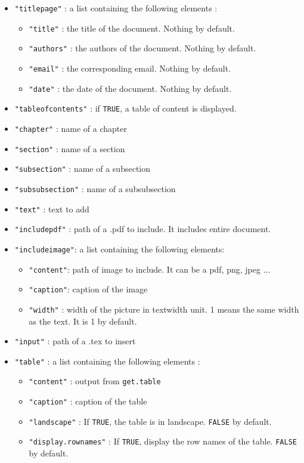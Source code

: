 \documentclass{article}\usepackage[]{graphicx}\usepackage[]{color}
\begin{document}
\begin{itemize}
\item \texttt{"titlepage"} : a list containing the following elements :
	\begin{itemize}
	\item \texttt{"title"} : the title of the document. Nothing by default.
	\item \texttt{"authors"} : the authors of the document. Nothing by default.
	\item \texttt{"email"} : the corresponding email. Nothing by default.
	\item \texttt{"date"} : the date of the document. Nothing by default.
	\end{itemize}

\item \texttt{"tableofcontents"} : if \texttt{TRUE}, a table of content is displayed.

\item \texttt{"chapter"} : name of a chapter

\item \texttt{"section"} : name of a section

\item \texttt{"subsection"} : name of a subsection

\item \texttt{"subsubsection"} : name of a subsubsection

\item \texttt{"text"} : text to add

\item \texttt{"includepdf"} : path of a .pdf to include. It includes entire document.

\item \texttt{"includeimage"}: a list containing the following elements:
	\begin{itemize}
	\item \texttt{"content"}: path of image to include. It can be a pdf, png, jpeg ...
	\item \texttt{"caption"}: caption of the image
	\item \texttt{"width"} : width of the picture in textwidth unit. 1 means the same width as the text. It is 1 by default.
	\end{itemize}

\item \texttt{"input"} : path of a .tex to insert

\item \texttt{"table"} : a list containing the following elements :
	\begin{itemize}
	\item \texttt{"content"} : output from \texttt{get.table}
	\item \texttt{"caption"} : caption of the table
	\item \texttt{"landscape"} : If \texttt{TRUE}, the table is in landscape. \texttt{FALSE} by default.
	\item \texttt{"display.rownames"} : If \texttt{TRUE}, display the row names of the table. \texttt{FALSE} by default.
	\end{itemize}


\end{itemize}
\end{document}

